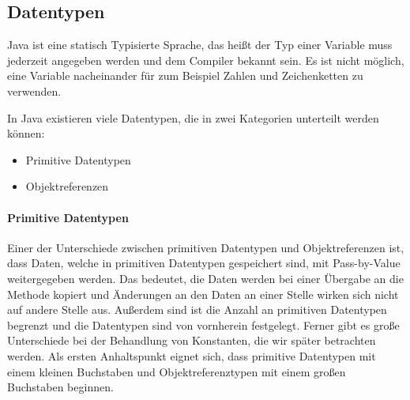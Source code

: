 \subsection{Datentypen}
	
	Java ist eine statisch Typisierte Sprache, das heißt der Typ einer Variable muss jederzeit angegeben werden und dem Compiler bekannt sein. Es ist nicht möglich, eine Variable nacheinander für zum Beispiel Zahlen und Zeichenketten zu verwenden.
	
	In Java existieren viele Datentypen, die in zwei Kategorien unterteilt werden können:
	\begin{itemize}
		\item Primitive Datentypen
		\item Objektreferenzen
	\end{itemize}
	
	\paragraph{Primitive Datentypen}
		Einer der Unterschiede zwischen primitiven Datentypen und Objektreferenzen ist, dass Daten, welche in primitiven Datentypen gespeichert sind, mit Pass-by-Value weitergegeben werden. Das bedeutet, die Daten werden bei einer Übergabe an die Methode kopiert und Änderungen an den Daten an einer Stelle wirken sich nicht auf andere Stelle aus. Außerdem sind ist die Anzahl an primitiven Datentypen begrenzt und die Datentypen sind von vornherein festgelegt. Ferner gibt es große Unterschiede bei der Behandlung von Konstanten, die wir später betrachten werden. Als ersten Anhaltspunkt eignet sich, dass primitive Datentypen mit einem kleinen Buchstaben und Objektreferenztypen mit einem großen Buchstaben beginnen.
		
